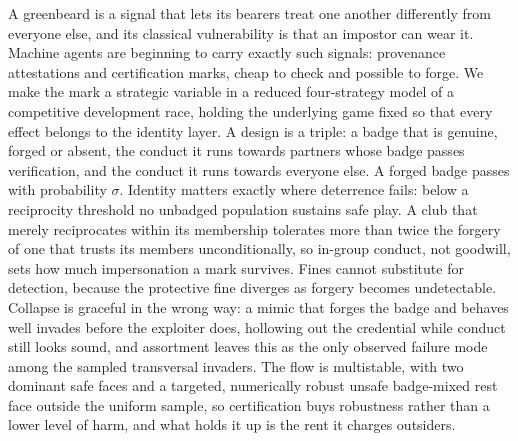 
\noindent
A greenbeard is a signal that lets its bearers treat one another differently
from everyone else, and its classical vulnerability is that an impostor can wear
it. Machine agents are beginning to carry exactly such signals: provenance
attestations and certification marks, cheap to check and possible to forge. We
make the mark a strategic variable in a reduced four-strategy model of a
competitive development race, holding the underlying game fixed so that every
effect belongs to the identity layer. A design is a triple: a badge that is
genuine, forged or absent, the conduct it runs towards partners whose badge
passes verification, and the conduct it runs towards everyone else. A forged
badge passes with probability $\sigma$. Identity matters exactly where
deterrence fails: below a reciprocity threshold no unbadged population sustains
safe play. A club that merely reciprocates within its membership tolerates more
than twice the forgery of one that trusts its members unconditionally, so
in-group conduct, not goodwill, sets how much impersonation a mark survives.
Fines cannot substitute for detection, because the protective fine diverges as
forgery becomes undetectable. Collapse is graceful in the wrong way: a mimic
that forges the badge and behaves well invades before the exploiter does,
hollowing out the credential while conduct still looks sound, and assortment
leaves this as the only observed failure mode among the sampled transversal
invaders. The flow is multistable, with two dominant safe faces and a targeted,
numerically robust unsafe badge-mixed rest face outside the uniform sample, so
certification buys robustness rather than a lower level of harm,
and what holds it up is the rent it charges outsiders.

